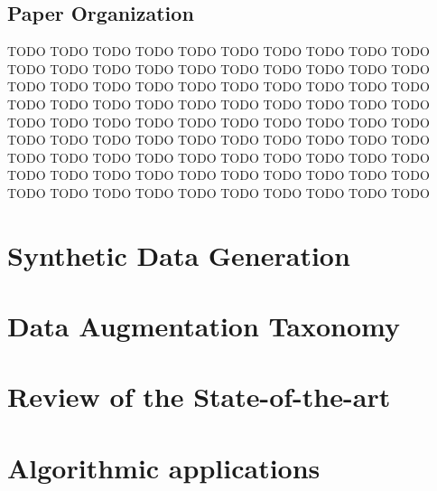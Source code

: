 \documentclass[parskip=full]{scrartcl}
\begin{document}
\subsection{Paper Organization}

TODO TODO TODO TODO TODO TODO TODO TODO TODO TODO TODO TODO TODO TODO TODO
TODO TODO TODO TODO TODO TODO TODO TODO TODO TODO TODO TODO TODO TODO TODO
TODO TODO TODO TODO TODO TODO TODO TODO TODO TODO TODO TODO TODO TODO TODO
TODO TODO TODO TODO TODO TODO TODO TODO TODO TODO TODO TODO TODO TODO TODO
TODO TODO TODO TODO TODO TODO TODO TODO TODO TODO TODO TODO TODO TODO TODO
TODO TODO TODO TODO TODO TODO TODO TODO TODO TODO TODO TODO TODO TODO TODO

\section{Synthetic Data Generation}


\section{Data Augmentation Taxonomy}

\section{Review of the State-of-the-art}

\section{Algorithmic applications}



\end{document}

